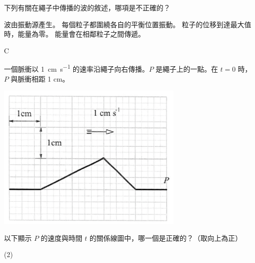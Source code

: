 {
    下列有關在繩子中傳播的波的敘述，哪項是不正確的？
    \begin{tasks}
        \task 波由振動源產生。
        \task 每個粒子都圍繞各自的平衡位置振動。
        \task 粒子的位移到達最大值時，能量為零。
        \task 能量會在相鄰粒子之間傳遞。
    \end{tasks}

}{
    \mckey C
}

{
    一個脈衝以 \qty{1}{cm.s^{-1}} 的速率沿繩子向右傳播。$P$ 是繩子上的一點。在 $t=0$ 時，$P$ 與脈衝相距 1 cm。
    \par{\par\centering\includegraphics[width=.35\textwidth]{./img/ch1_earlyclass_wave_mc_2024-05-13-20-31-17.png}\par}
    以下顯示 $P$ 的速度與時間 $t$ 的關係線圖中，哪一個是正確的？（取向上為正）
    \begin{tasks}(2)
        \task {}
        \task {}
        \task {}

\end{tasks}}
